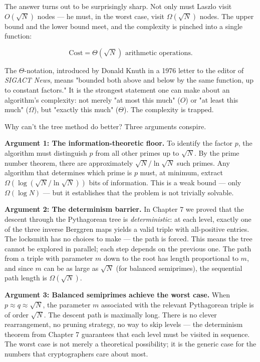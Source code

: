 \documentclass[11pt,openany]{book}
\theoremstyle{definition}
\theoremstyle{plain}
\theoremstyle{remark}
\begin{document}
The answer turns out to be surprisingly sharp. Not only must Laszlo visit $O(\sqrt{N})$ nodes — he must, in the worst case, visit $\Omega(\sqrt{N})$ nodes. The upper bound and the lower bound meet, and the complexity is pinched into a single function:

$$\text{Cost} = \Theta(\sqrt{N}) \text{ arithmetic operations.}$$

The $\Theta$-notation, introduced by Donald Knuth in a 1976 letter to the editor of \textit{SIGACT News}, means "bounded both above and below by the same function, up to constant factors." It is the strongest statement one can make about an algorithm's complexity: not merely "at most this much" ($O$) or "at least this much" ($\Omega$), but "exactly this much" ($\Theta$). The complexity is trapped.

Why can't the tree method do better? Three arguments conspire.

\textbf{Argument 1: The information-theoretic floor.} To identify the factor $p$, the algorithm must distinguish $p$ from all other primes up to $\sqrt{N}$. By the prime number theorem, there are approximately $\sqrt{N} / \ln \sqrt{N}$ such primes. Any algorithm that determines which prime is $p$ must, at minimum, extract $\Omega(\log(\sqrt{N} / \ln \sqrt{N}))$ bits of information. This is a weak bound — only $\Omega(\log N)$ — but it establishes that the problem is not trivially solvable.

\textbf{Argument 2: The determinism barrier.} In Chapter 7 we proved that the descent through the Pythagorean tree is \textit{deterministic}: at each level, exactly one of the three inverse Berggren maps yields a valid triple with all-positive entries. The locksmith has no choices to make — the path is forced. This means the tree cannot be explored in parallel; each step depends on the previous one. The path from a triple with parameter $m$ down to the root has length proportional to $m$, and since $m$ can be as large as $\sqrt{N}$ (for balanced semiprimes), the sequential path length is $\Omega(\sqrt{N})$.

\textbf{Argument 3: Balanced semiprimes achieve the worst case.} When $p \approx q \approx \sqrt{N}$, the parameter $m$ associated with the relevant Pythagorean triple is of order $\sqrt{N}$. The descent path is maximally long. There is no clever rearrangement, no pruning strategy, no way to skip levels — the determinism theorem from Chapter 7 guarantees that each level must be visited in sequence. The worst case is not merely a theoretical possibility; it is the generic case for the numbers that cryptographers care about most.
\end{document}
